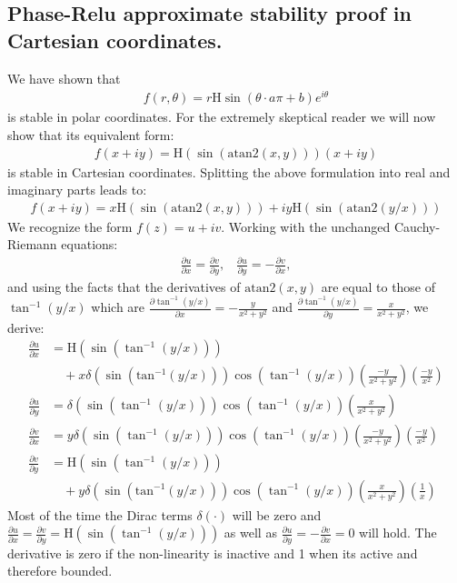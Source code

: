 \documentclass{article}
\begin{document}
\subsection{Phase-Relu approximate stability proof in Cartesian coordinates.}
\label{sec:CarthesianPhaseRelu}
We have shown that 
\begin{align}
f(r,\theta) = r\text{H}\sin(\theta \cdot a \pi + b)e^{i\theta}
\end{align}
is stable in polar coordinates. For the extremely skeptical reader we will now show that its equivalent form:
\begin{align}
f(x + iy) = \text{H}(\sin(\text{atan2}(x,y)))(x + iy)
\end{align}
is stable in Cartesian coordinates.
Splitting the above formulation into real and imaginary parts leads to:
\begin{align}
f(x + iy) = x\text{H}(\sin(\text{atan2}(x,y))) + i y\text{H}(\sin(\text{atan2}(y/x)))
\end{align} 
We recognize the form $f(z) = u + iv$. Working with the unchanged Cauchy-Riemann equations:
\begin{align}
\frac{\partial u}{\partial x} = \frac{\partial v}{\partial y}, \;\;\; \frac{\partial u}{\partial y} = - \frac{\partial v}{\partial x},
\end{align}
and using the facts that the derivatives of $\text{atan2}(x,y)$ are equal to those of $\tan^{-1}(y/x)$ which are $\frac{\partial \tan^{-1}(y/x)}{\partial x} = -\frac{y}{x^2 + y^2}$ and $\frac{\partial \tan^{-1}(y/x)}{\partial y} = \frac{x}{x^2 + y^2}$, we derive:
\begin{align}
\frac{\partial u}{\partial x} &= \text{H}(\sin(\tan^{-1}(y/x))) \nonumber \\
&\quad +x\delta(\sin(\text{tan}^{-1}(y/x)))\cos(\tan^{-1}(y/x))(\frac{-y}{x^2 + y^2})(\frac{-y}{x^2}) \\
\frac{\partial u}{\partial y} &= \delta(\sin(\tan^{-1}( y/x)))\cos(\tan^{-1}(y/x))(\frac{x}{x^2 + y^2}) \\
\frac{\partial v}{\partial x} &= y\delta(\sin(\tan^{-1}( y/x)))\cos(\tan^{-1}(y/x))(\frac{-y}{x^2 + y^2})(\frac{-y}{x^2}) \\
\frac{\partial v}{\partial y} &= \text{H}(\sin(\tan^{-1}(y/x))) \nonumber \\
&\quad + y\delta(\sin(\text{tan}^{-1}(y/x)))\cos(\tan^{-1}(y/x))(\frac{x}{x^2 + y^2})(\frac{1}{x})
\end{align}
Most of the time the Dirac terms $\delta(\cdot)$ will be zero and $\frac{\partial u}{\partial x} = \frac{\partial v}{\partial y} = \text{H}(\sin(\tan^{-1}(y/x)))$ as well as $\frac{\partial u}{\partial y} = - \frac{\partial v}{\partial x} = 0$ will hold. The derivative is zero if the non-linearity is inactive and 1 when its active and therefore bounded.
\end{document}

